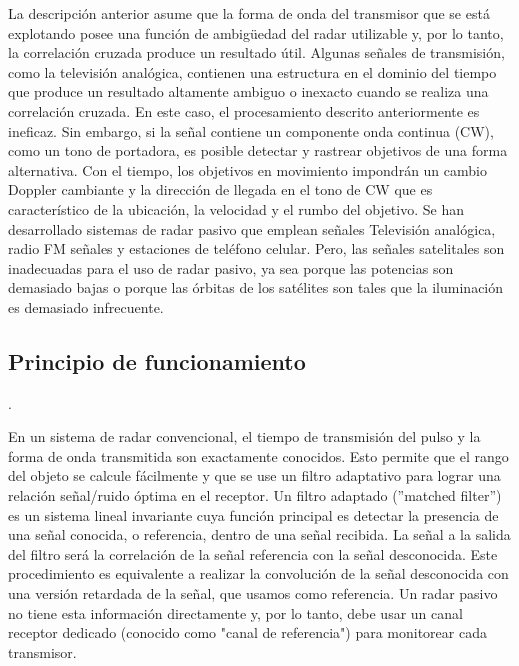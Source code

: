 La descripción anterior asume que la forma de onda del transmisor que se está explotando posee una función de ambigüedad del radar utilizable y, por lo tanto, la correlación cruzada produce un resultado útil. Algunas señales de transmisión, como la televisión analógica, contienen una estructura en el dominio del tiempo que produce un resultado altamente ambiguo o inexacto cuando se realiza una correlación cruzada. En este caso, el procesamiento descrito anteriormente es ineficaz. Sin embargo, si la señal contiene un componente onda continua (CW), como un tono de portadora, es posible detectar y rastrear objetivos de una forma alternativa. Con el tiempo, los objetivos en movimiento impondrán un cambio Doppler cambiante y la dirección de llegada en el tono de CW que es característico de la ubicación, la velocidad y el rumbo del objetivo. 
Se han desarrollado sistemas de radar pasivo que emplean señales Televisión analógica, radio FM señales y estaciones de teléfono celular. Pero, las señales satelitales son inadecuadas para el uso de radar pasivo, ya sea porque las potencias son demasiado bajas o porque las órbitas de los satélites son tales que la iluminación es demasiado infrecuente. 


\subsection{Principio de funcionamiento}. 

En un sistema de radar convencional, el tiempo de transmisión del pulso y la forma de onda transmitida son exactamente conocidos. Esto permite que el rango del objeto se calcule fácilmente y que se use un filtro adaptativo para lograr una relación señal/ruido óptima en el receptor. 
Un filtro adaptado (''matched filter'') es un sistema lineal invariante cuya función principal es detectar la presencia de una señal conocida, o referencia, dentro de una señal recibida. La señal a la salida del filtro será la correlación de la señal referencia con la señal desconocida. Este procedimiento es equivalente a realizar la convolución de la señal desconocida con una versión retardada de la señal, que usamos como referencia.
Un radar pasivo no tiene esta información directamente y, por lo tanto, debe usar un canal receptor dedicado (conocido como "canal de referencia") para monitorear cada transmisor.

